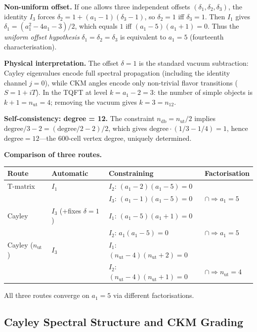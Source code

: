 \documentclass[12pt,a4paper]{article}
\theoremstyle{definition}
\begin{document}
\textbf{Non-uniform offset.}  If one allows three independent offsets $(\delta_1, \delta_2, \delta_3)$, the identity $I_3$ forces $\delta_2 = 1 + (a_1-1)(\delta_3-1)$, so $\delta_2 = 1$ iff $\delta_3 = 1$.  Then $I_1$ gives $\delta_1 = (a_1^2 - 4a_1 - 3)/2$, which equals $1$ iff $(a_1-5)(a_1+1) = 0$.  Thus the \emph{uniform offset hypothesis} $\delta_1 = \delta_2 = \delta_3$ is equivalent to $a_1 = 5$ (fourteenth characterisation).

\textbf{Physical interpretation.}  The offset $\delta = 1$ is the standard vacuum subtraction: Cayley eigenvalues encode full spectral propagation (including the identity channel $j = 0$), while CKM angles encode only non-trivial flavor transitions ($S = 1 + iT$).  In the TQFT at level $k = a_1 - 2 = 3$: the number of simple objects is $k + 1 = n_{\text{ut}} = 4$; removing the vacuum gives $k = 3 = n_{12}$.

\textbf{Self-consistency: degree = 12.}  The constraint $n_{\text{db}} = n_{\text{ut}}/2$ implies $\text{degree}/3 - 2 = (\text{degree}/2 - 2)/2$, which gives $\text{degree} \cdot (1/3 - 1/4) = 1$, hence $\text{degree} = 12$---the 600-cell vertex degree, uniquely determined.

\textbf{Comparison of three routes.}
\begin{center}
\begin{tabular}{llll}
\toprule
\textbf{Route} & \textbf{Automatic} & \textbf{Constraining} & \textbf{Factorisation} \\
\midrule
T-matrix & $I_1$ & $I_2$: $(a_1-2)(a_1-5)=0$ & \\
         &       & $I_3$: $(a_1-1)(a_1-5)=0$ & $\cap \Rightarrow a_1=5$ \\
Cayley   & $I_3$ (+fixes $\delta=1$) & $I_1$: $(a_1-5)(a_1+1)=0$ & \\
         &       & $I_2$: $a_1(a_1-5)=0$ & $\cap \Rightarrow a_1=5$ \\
Cayley ($n_{\text{ut}}$) & $I_3$ & $I_1$: $(n_{\text{ut}}-4)(n_{\text{ut}}+2)=0$ & \\
         &       & $I_2$: $(n_{\text{ut}}-4)(n_{\text{ut}}+1)=0$ & $\cap \Rightarrow n_{\text{ut}}=4$ \\
\bottomrule
\end{tabular}
\end{center}
All three routes converge on $a_1 = 5$ via different factorisations.

\subsection{Cayley Spectral Structure and CKM Grading}
\label{sec:S-cayley-spectral}
\end{document}
